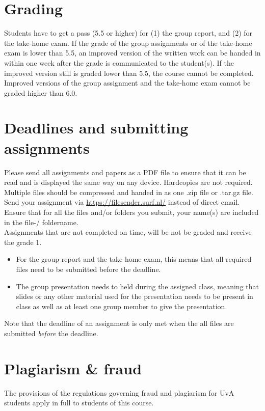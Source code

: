 \documentclass[a4paper,10pt,twocolumn]{report}
\begin{document}
\section{Grading}
Students have to get a pass (5.5 or higher) for (1) the group report, and (2) for the take-home exam. If the grade of the group assignments or of the take-home exam is lower than 5.5, an improved version of the written work can be handed in within one week after the grade is communicated to the student(s). If the improved version still is graded lower than 5.5, the course cannot be completed. Improved versions of the group assignment and the take-home exam cannot be graded higher than 6.0. 

\section{Deadlines and submitting assignments}
Please send all assignments and papers as a PDF file to ensure that it can be read and is displayed the same way on any device. Hardcopies are not required. Multiple files should be compressed and handed in as one .zip file or .tar.gz file. Send your assignment via \url{https://filesender.surf.nl/} instead of direct email. Ensure that for all the files and/or folders you submit, your name(s) are included in the file-/ foldername. \\
	
Assignments that are not completed on time, will be not be graded and receive the grade 1. 
	\begin{itemize}
		\item For the group report and the take-home exam, this means that all required files need to be submitted before the deadline. 
		\item The group presentation needs to held during the assigned class, meaning that slides or any other material used for the presentation needs to be present in class as well as at least one group member to give the presentation. 
	\end{itemize}
Note that the deadline of an assignment is only met when the all files are submitted \emph{before} the deadline.

\section{Plagiarism \& fraud}
The provisions of the regulations governing fraud and plagiarism for UvA students apply in full to students of this course. \\
\end{document}
